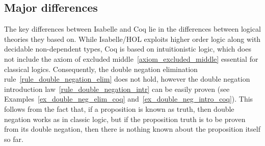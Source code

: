 \documentclass[article]{aaltoseries}
\begin{document}



\subsection{Major differences}

The key differences between Isabelle and Coq lie in the differences between logical theories they based on. While Isabelle/HOL exploits higher order logic along with decidable non-dependent types, Coq is based on intuitionistic logic, which does not include the axiom of excluded middle~\eqref{axiom_excluded_middle} essential for classical logics.
Consequently, the double negation elimination rule~\eqref{rule_double_negation_elim} does not hold, however the double negation introduction law~\eqref{rule_double_negation_intr} can be easily proven (see Examples~\ref{ex_double_neg_elim_coq} and~\ref{ex_double_neg_intro_coq}). This follows from the fact that, if a proposition is known as truth, then double negation works as in classic logic, but if the proposition truth is to be proven from its double negation, then there is nothing known about the proposition itself so far.
\end{document}
